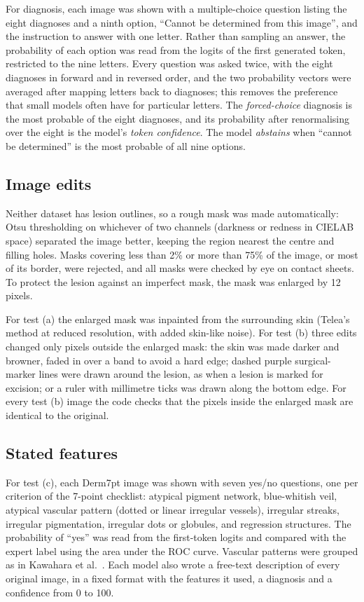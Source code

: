 \documentclass[11pt,a4paper]{article}
\begin{document}
For diagnosis, each image was shown with a multiple-choice question listing the eight diagnoses and a ninth option, ``Cannot be determined from this image'', and the instruction to answer with one letter. Rather than sampling an answer, the probability of each option was read from the logits of the first generated token, restricted to the nine letters. Every question was asked twice, with the eight diagnoses in forward and in reversed order, and the two probability vectors were averaged after mapping letters back to diagnoses; this removes the preference that small models often have for particular letters. The \emph{forced-choice} diagnosis is the most probable of the eight diagnoses, and its probability after renormalising over the eight is the model's \emph{token confidence}. The model \emph{abstains} when ``cannot be determined'' is the most probable of all nine options.

\subsection{Image edits}

Neither dataset has lesion outlines, so a rough mask was made automatically: Otsu thresholding on whichever of two channels (darkness or redness in CIELAB space) separated the image better, keeping the region nearest the centre and filling holes. Masks covering less than 2\% or more than 75\% of the image, or most of its border, were rejected, and all masks were checked by eye on contact sheets. To protect the lesion against an imperfect mask, the mask was enlarged by 12 pixels.

For test (a) the enlarged mask was inpainted from the surrounding skin (Telea's method at reduced resolution, with added skin-like noise). For test (b) three edits changed only pixels outside the enlarged mask: the skin was made darker and browner, faded in over a band to avoid a hard edge; dashed purple surgical-marker lines were drawn around the lesion, as when a lesion is marked for excision; or a ruler with millimetre ticks was drawn along the bottom edge. For every test (b) image the code checks that the pixels inside the enlarged mask are identical to the original.

\subsection{Stated features}

For test (c), each Derm7pt image was shown with seven yes/no questions, one per criterion of the 7-point checklist: atypical pigment network, blue-whitish veil, atypical vascular pattern (dotted or linear irregular vessels), irregular streaks, irregular pigmentation, irregular dots or globules, and regression structures. The probability of ``yes'' was read from the first-token logits and compared with the expert label using the area under the ROC curve. Vascular patterns were grouped as in Kawahara et al.\ \cite{kawahara2019}. Each model also wrote a free-text description of every original image, in a fixed format with the features it used, a diagnosis and a confidence from 0 to 100.
\end{document}
